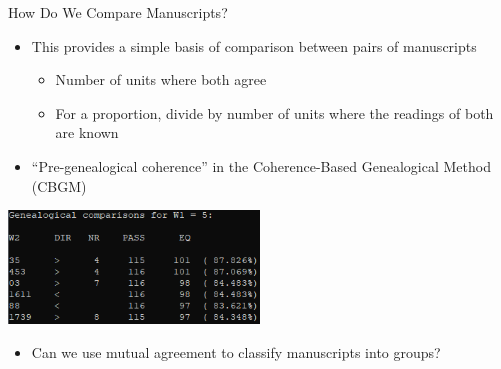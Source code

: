\documentclass[10pt]{beamer}
\begin{document}
%			
	\begin{frame}{How Do We Compare Manuscripts?}
		\begin{itemize}
			\item This provides a simple basis of comparison between pairs of manuscripts
			\begin{itemize}
				\item Number of units where both agree
				\item For a proportion, divide by number of units where the readings of both are known
			\end{itemize}
			\item ``Pre-genealogical coherence'' in the Coherence-Based Genealogical Method (CBGM)
		\end{itemize}
		\begin{center}
			\includegraphics[width=0.5\textwidth]{../graphics/compare_witnesses.png}
		\end{center}
		\begin{itemize}
			\item Can we use mutual agreement to classify manuscripts into groups?
		\end{itemize}
	\end{frame}
\end{document}
